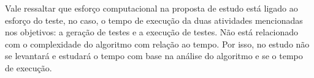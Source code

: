 Vale ressaltar que esforço computacional na proposta de estudo está ligado ao esforço do teste, no caso, o tempo de execução da duas atividades mencionadas nos objetivos: a geração de testes e a execução de testes. Não está relacionado com o complexidade do algoritmo com relação ao tempo. Por isso, no estudo não se levantará e estudará o tempo com base na análise do algoritmo e se o tempo de execução.











